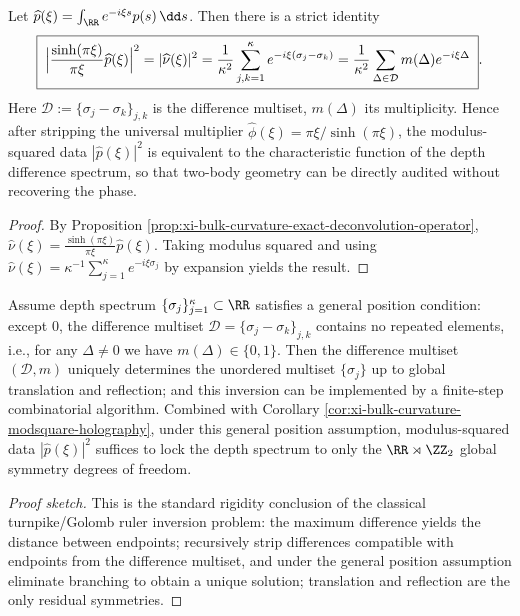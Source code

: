 
\begin{corollary}\label{cor:xi-bulk-curvature-modsquare-holography}
Let
\(
\widehat p(\xi)=\int_{\RR}e^{-i\xi s}p(s)\,\dd s
\).
Then there is a strict identity
\[
\boxed{\;
\Bigl|\frac{\sinh(\pi\xi)}{\pi\xi}\widehat p(\xi)\Bigr|^2
=|\widehat\nu(\xi)|^2
=\frac{1}{\kappa^2}\sum_{j,k=1}^{\kappa}e^{-i\xi(\sigma_j-\sigma_k)}
=\frac{1}{\kappa^2}\sum_{\Delta\in\mathcal D}m(\Delta)e^{-i\xi\Delta}\; }.
\]
Here \(\mathcal D:=\{\sigma_j-\sigma_k\}_{j,k}\) is the difference multiset, \(m(\Delta)\) its multiplicity.
Hence after stripping the universal multiplier \(\widehat\phi(\xi)=\pi\xi/\sinh(\pi\xi)\), the modulus-squared data \(|\widehat p(\xi)|^2\) is equivalent to the characteristic function of the depth difference spectrum, so that two-body geometry can be directly audited without recovering the phase.
\end{corollary}
\begin{proof}
By Proposition \ref{prop:xi-bulk-curvature-exact-deconvolution-operator},
\(
\widehat\nu(\xi)=\frac{\sinh(\pi\xi)}{\pi\xi}\widehat p(\xi)
\).
Taking modulus squared and using
\(
\widehat\nu(\xi)=\kappa^{-1}\sum_{j=1}^{\kappa}e^{-i\xi\sigma_j}
\)
by expansion yields the result.
\end{proof}

\begin{corollary}\label{cor:xi-bulk-curvature-difference-multiset-rigid-inversion}
Assume depth spectrum \(\{\sigma_j\}_{j=1}^{\kappa}\subset\RR\) satisfies a general position condition: except \(0\), the difference multiset \(\mathcal D=\{\sigma_j-\sigma_k\}_{j,k}\) contains no repeated elements, i.e., for any \(\Delta\neq 0\) we have \(m(\Delta)\in\{0,1\}\).
Then the difference multiset \((\mathcal D,m)\) uniquely determines the unordered multiset \(\{\sigma_j\}\) up to global translation and reflection; and this inversion can be implemented by a finite-step combinatorial algorithm.
Combined with Corollary \ref{cor:xi-bulk-curvature-modsquare-holography}, under this general position assumption, modulus-squared data \(|\widehat p(\xi)|^{2}\) suffices to lock the depth spectrum to only the \(\RR\rtimes\ZZ_2\) global symmetry degrees of freedom.
\end{corollary}
\begin{proof}[Proof sketch]
This is the standard rigidity conclusion of the classical turnpike/Golomb ruler inversion problem: the maximum difference yields the distance between endpoints; recursively strip differences compatible with endpoints from the difference multiset, and under the general position assumption eliminate branching to obtain a unique solution; translation and reflection are the only residual symmetries.
\end{proof}

